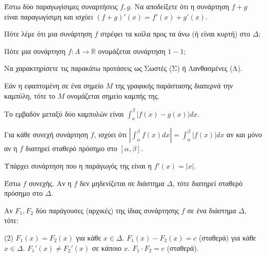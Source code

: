 \documentclass[11pt,a4paper]{article}
\newcommand{\kerkissans}[1]{{\fontfamily{maksf}\selectfont \textbf{#1}}}
\renewcommand{\textdexiakeraia}{}
\newcommand{\dint}{\displaystyle\int}
\newcommand\themanum{A}
\newcounter{thema}[section]
\renewcommand{\thethema}{\arabic{thema}}
\newcommand{\Thema}{\refstepcounter{thema}{\textbf{\textcolor{black}{\faPenSquare\ \  \large \kerkissans{\textbf{\thethemaο\hspace{2mm}Διαγώνισμα - Θέμα \themanum}}}}}\hspace{0mm}}{}
\newenvironment{thema}[1]
{\begin{tcolorbox}[title=\Thema\kerkissans{\textbf{\large{  #1}}},breakable,
enhanced standard,titlerule=0pt,toprule=0pt, rightrule=0pt, bottomrule=0pt,
colback=white,left=0mm,top=1mm,bottom=0mm,
boxrule=0pt,
colframe=white,leftrule=0mm,sharp corners,coltitle=black]
\renewcommand{\themanum}{#1}}
{\end{tcolorbox}}
\begin{document}
\begin{thema}{A}
\begin{erwthma}
    \item Έστω δύο παραγωγίσιμες συναρτήσεις $f, g$. Να αποδείξετε ότι η συνάρτηση $f+g$ είναι παραγωγίσιμη και ισχύει $(f+g)'(x) = f'(x) + g'(x)$.
    \item Πότε λέμε ότι μια συνάρτηση $f$ στρέφει τα κοίλα προς τα άνω (ή είναι κυρτή) στο $\Delta$;
    \item Πότε μια συνάρτηση $f:A\to\mathbb{R}$ ονομάζεται συνάρτηση $1-1$;
    \item Να χαρακτηρίσετε τις παρακάτω προτάσεις ως Σωστές (Σ) ή Λανθασμένες (Λ).
    \begin{alist}
        \item Εάν η εφαπτομένη σε ένα σημείο $M$ της γραφικής παράστασης διαπερνά την καμπύλη, τότε το $M$ ονομάζεται σημείο καμπής της.
        \item Το εμβαδόν μεταξύ δύο καμπυλών είναι $\dint_a^\beta |f(x) - g(x)| dx$.
        \item Για κάθε συνεχή συνάρτηση $f$, ισχύει ότι $\left| \dint_\alpha^\beta f(x)dx \right| = \dint_\alpha^\beta |f(x)|dx$ αν και μόνο αν η $f$ διατηρεί σταθερό πρόσημο στο $[\alpha, \beta]$.
        \item Υπάρχει συνάρτηση που η παράγωγός της είναι η $f'(x) = |x|$.
        \item Έστω $f$ συνεχής. Αν η $f$ δεν μηδενίζεται σε διάστημα $\Delta$, τότε διατηρεί σταθερό πρόσημο στο $\Delta$.
    \end{alist}
    \item Αν $F_1, F_2$ δύο παράγουσες (αρχικές) της ίδιας συνάρτησης $f$ σε ένα διάστημα $\Delta$, τότε:
    \begin{tasks}[label=\let\textdexiakeraia\relax\alph*.](2)
        \task $F_1(x) = F_2(x)$ για κάθε $x \in \Delta$.
        \task $F_1(x) - F_2(x) = c$ (σταθερά) για κάθε $x \in \Delta$.
        \task $F_1'(x) \ne F_2'(x)$ σε κάποιο $x$.
        \task $F_1 \cdot F_2 = c$ (σταθερά).
    \end{tasks}
\end{erwthma}
\end{thema}
\vspace{1cm}
\end{document}
